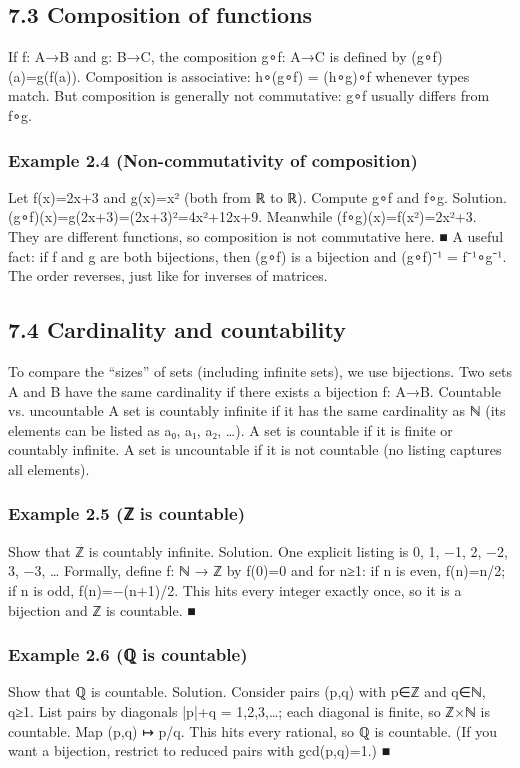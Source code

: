 \documentclass[11pt]{article}
\begin{document}
\subsection{7.3 Composition of functions}
If f: A→B and g: B→C, the composition g∘f: A→C is defined by (g∘f)(a)=g(f(a)). Composition
is associative: h∘(g∘f) = (h∘g)∘f whenever types match. But composition is generally not
commutative: g∘f usually differs from f∘g.
\subsubsection*{Example 2.4 (Non-commutativity of composition)}
Let f(x)=2x+3 and g(x)=x² (both from ℝ to ℝ). Compute g∘f and f∘g.
Solution. (g∘f)(x)=g(2x+3)=(2x+3)²=4x²+12x+9.
Meanwhile (f∘g)(x)=f(x²)=2x²+3.
They are different functions, so composition is not commutative here. ■
A useful fact: if f and g are both bijections, then (g∘f) is a bijection and (g∘f)⁻¹ = f⁻¹∘g⁻¹.
The order reverses, just like for inverses of matrices.

\subsection{7.4 Cardinality and countability}
To compare the “sizes” of sets (including infinite sets), we use bijections. Two sets A and B
have the same cardinality if there exists a bijection f: A→B.
Countable vs. uncountable
A set is countably infinite if it has the same cardinality as ℕ (its elements can be
listed as a₀, a₁, a₂, …).
A set is countable if it is finite or countably infinite.
A set is uncountable if it is not countable (no listing captures all elements).
\subsubsection*{Example 2.5 (ℤ is countable)}
Show that ℤ is countably infinite.
Solution. One explicit listing is 0, 1, −1, 2, −2, 3, −3, …
Formally, define f: ℕ → ℤ by f(0)=0 and for n≥1:
if n is even, f(n)=n/2; if n is odd, f(n)=−(n+1)/2.
This hits every integer exactly once, so it is a bijection and ℤ is countable. ■
\subsubsection*{Example 2.6 (ℚ is countable)}
Show that ℚ is countable.
Solution. Consider pairs (p,q) with p∈ℤ and q∈ℕ, q≥1. List pairs by diagonals
|p|+q = 1,2,3,…; each diagonal is finite, so ℤ×ℕ is countable.
Map (p,q) ↦ p/q. This hits every rational, so ℚ is countable. (If you want a bijection,
restrict to reduced pairs with gcd(p,q)=1.) ■
\end{document}
